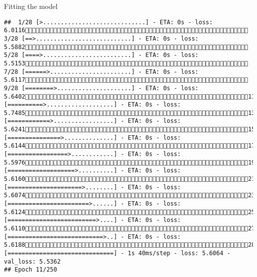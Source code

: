 \documentclass[
  ignorenonframetext,
]{beamer}
\begin{document}
\begin{frame}[fragile]{Fitting the model}
\begin{verbatim}
##  1/28 [>.............................] - ETA: 0s - loss: 6.0116 3/28 [==>...........................] - ETA: 0s - loss: 5.5882 5/28 [====>.........................] - ETA: 0s - loss: 5.5153 7/28 [======>.......................] - ETA: 0s - loss: 5.6117 9/28 [========>.....................] - ETA: 0s - loss: 5.640211/28 [==========>...................] - ETA: 0s - loss: 5.748513/28 [============>.................] - ETA: 0s - loss: 5.624115/28 [===============>..............] - ETA: 0s - loss: 5.614417/28 [=================>............] - ETA: 0s - loss: 5.597619/28 [===================>..........] - ETA: 0s - loss: 5.616021/28 [=====================>........] - ETA: 0s - loss: 5.607423/28 [=======================>......] - ETA: 0s - loss: 5.612425/28 [=========================>....] - ETA: 0s - loss: 5.611027/28 [===========================>..] - ETA: 0s - loss: 5.618828/28 [==============================] - 1s 40ms/step - loss: 5.6064 - val_loss: 5.5362
## Epoch 11/250

\end{verbatim}
\end{frame}
\end{document}
